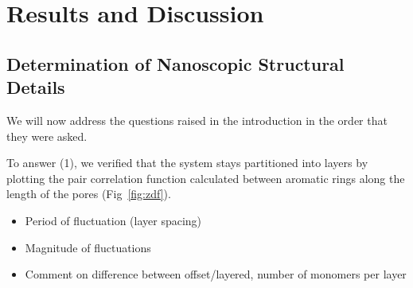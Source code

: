 \documentclass{article}
\begin{document}
  \section*{Results and Discussion}
  
  \subsection*{Determination of Nanoscopic Structural Details}
  
  
  We will now address the questions raised in the introduction in the order
  that they were asked.  %

  To answer (1), we verified that the system stays partitioned into layers by
  plotting the pair correlation function calculated between aromatic rings along
  the length of the pores (Fig~\ref{fig:zdf}).
  \begin{itemize}
	\item Period of fluctuation (layer spacing)
        \item Magnitude of fluctuations
	\item Comment on difference between offset/layered, number of monomers per layer
  \end{itemize} 	
\end{document}
